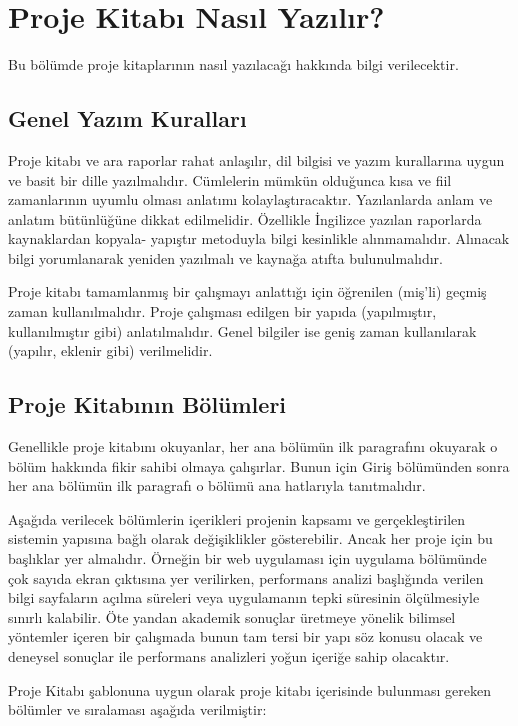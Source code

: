 \chapter{Proje Kitabı Nasıl Yazılır?}

Bu bölümde proje kitaplarının nasıl yazılacağı hakkında bilgi verilecektir.

\section{Genel Yazım Kuralları}

Proje kitabı ve ara raporlar rahat anlaşılır, dil bilgisi ve yazım kurallarına uygun ve basit bir dille yazılmalıdır. Cümlelerin mümkün olduğunca kısa ve fiil zamanlarının uyumlu olması anlatımı kolaylaştıracaktır. Yazılanlarda anlam ve anlatım bütünlüğüne dikkat edilmelidir. Özellikle İngilizce yazılan raporlarda kaynaklardan kopyala- yapıştır metoduyla bilgi kesinlikle alınmamalıdır. Alınacak bilgi yorumlanarak yeniden yazılmalı ve kaynağa atıfta bulunulmalıdır.

Proje kitabı tamamlanmış bir çalışmayı anlattığı için öğrenilen (miş’li) geçmiş zaman kullanılmalıdır. Proje çalışması edilgen bir yapıda (yapılmıştır, kullanılmıştır gibi) anlatılmalıdır. Genel bilgiler ise geniş zaman kullanılarak (yapılır, eklenir gibi) verilmelidir.

\section{Proje Kitabının Bölümleri}

Genellikle proje kitabını okuyanlar, her ana bölümün ilk paragrafını okuyarak o bölüm hakkında fikir sahibi olmaya çalışırlar. Bunun için Giriş bölümünden sonra her ana bölümün ilk paragrafı o bölümü ana hatlarıyla tanıtmalıdır.

Aşağıda verilecek bölümlerin içerikleri projenin kapsamı ve gerçekleştirilen sistemin yapısına bağlı olarak değişiklikler gösterebilir. Ancak her proje için bu başlıklar yer almalıdır. Örneğin bir web uygulaması için uygulama bölümünde çok sayıda ekran çıktısına yer verilirken, performans analizi başlığında verilen bilgi sayfaların açılma süreleri veya uygulamanın tepki süresinin ölçülmesiyle sınırlı kalabilir. Öte yandan akademik sonuçlar üretmeye yönelik bilimsel yöntemler içeren bir çalışmada bunun tam tersi bir yapı söz konusu olacak ve deneysel sonuçlar ile performans analizleri yoğun içeriğe sahip olacaktır. 

Proje Kitabı şablonuna uygun olarak proje kitabı içerisinde bulunması gereken bölümler ve sıralaması aşağıda verilmiştir:

